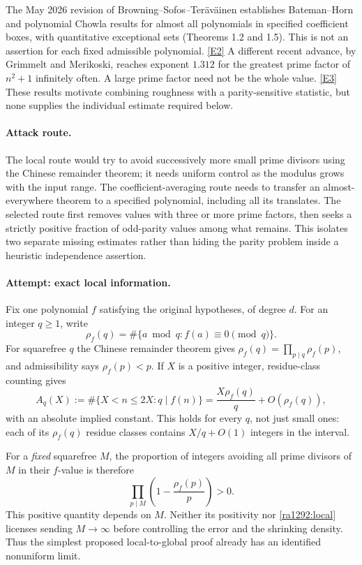 \documentclass[11pt]{article}
\newcommand{\eref}[2]{\hyperlink{extra:#1:#2}{[E#2]}}
\begin{document}
The May 2026 revision of Browning--Sofos--Ter\"av\"ainen establishes
Bateman--Horn and polynomial Chowla results for almost all polynomials in
specified coefficient boxes, with quantitative exceptional sets
(Theorems 1.2 and 1.5). This is not an assertion for each fixed admissible
polynomial. \eref{1292}{2}
A different recent advance, by Grimmelt and Merikoski, reaches exponent
$1.312$ for the greatest prime factor of $n^2+1$ infinitely often. A large
prime factor need not be the whole value. \eref{1292}{3}
These results motivate combining roughness with a parity-sensitive statistic,
but none supplies the individual estimate required below.

\paragraph{Attack route.}
The local route would try to avoid successively more small prime divisors
using the Chinese remainder theorem; it needs uniform control as the modulus
grows with the input range. The coefficient-averaging route needs to transfer
an almost-everywhere theorem to a specified polynomial, including all its
translates. The selected route first removes values with three or more prime
factors, then seeks a strictly positive fraction of odd-parity values among
what remains. This isolates two separate missing estimates rather than hiding
the parity problem inside a heuristic independence assertion.

\paragraph{Attempt: exact local information.}
Fix one polynomial $f$ satisfying the original hypotheses, of degree $d$.
For an integer $q\ge1$, write
\[
 \rho_f(q)=\#\{a\bmod q:f(a)\equiv0\pmod q\}.
\]
For squarefree $q$ the Chinese remainder theorem gives
$\rho_f(q)=\prod_{p\mid q}\rho_f(p)$, and admissibility says
$\rho_f(p)<p$. If $X$ is a positive integer, residue-class counting gives
\begin{equation}\label{ra1292:local}
 A_q(X):=\#\{X<n\le2X:q\mid f(n)\}
       =\frac{X\rho_f(q)}q+O(\rho_f(q)),
\end{equation}
with an absolute implied constant. This holds for every $q$, not just small
ones: each of its $\rho_f(q)$ residue classes contains $X/q+O(1)$ integers
in the interval.

For a \emph{fixed} squarefree $M$, the proportion of integers avoiding all
prime divisors of $M$ in their $f$-value is therefore
\[
 \prod_{p\mid M}\left(1-\frac{\rho_f(p)}p\right)>0.
\]
This positive quantity depends on $M$. Neither its positivity nor
\eqref{ra1292:local} licenses sending $M\to\infty$ before controlling the
error and the shrinking density. Thus the simplest proposed local-to-global
proof already has an identified nonuniform limit.
\end{document}
